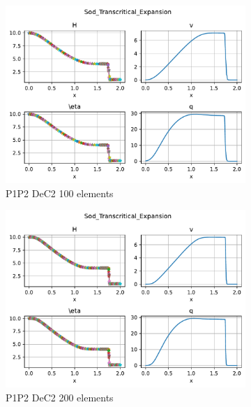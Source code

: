 \documentclass[english]{article}
\theoremstyle{thmstyleone}
\theoremstyle{thmstyletwo}
\theoremstyle{thmstylethree}
\begin{document}
\begin{figure}
{\begin{minipage}{\textwidth}
			\begin{subfigure}{0.45\textwidth}
				\includegraphics[trim= 0 180 0 0, clip,width=\textwidth]{figures/transcritical_expansion/P1P2_DeC_N_el00100.pdf}
				\caption{P1P2 DeC2 100 elements}
			\end{subfigure}
			\begin{subfigure}{0.45\textwidth}
				\includegraphics[trim= 0 180 0 0, clip,width=\textwidth]{figures/transcritical_expansion/P1P2_DeC_N_el00200.pdf}
				\caption{P1P2 DeC2 200 elements}
			\end{subfigure}
			\begin{subfigure}{0.45\textwidth}

\end{subfigure}
\end{minipage}}
\end{figure}
\end{document}
